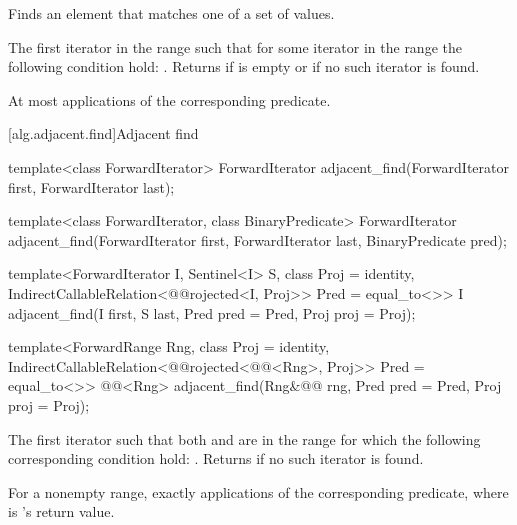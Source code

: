 \begin{itemdescr}
\pnum
\effects
Finds an element that matches one of a set of values.

\pnum
\returns
The first iterator
in the range 
such that for some
iterator
in the range 
the following condition hold:
.
Returns 
if  is empty or if
no such iterator is found.

\pnum
\complexity
At most
applications of the corresponding predicate.
\end{itemdescr}

[alg.adjacent.find]{Adjacent find}

%
\begin{removedblock}
\begin{itemdecl}
template<class ForwardIterator>
  ForwardIterator adjacent_find(ForwardIterator first, ForwardIterator last);

template<class ForwardIterator, class BinaryPredicate>
  ForwardIterator adjacent_find(ForwardIterator first, ForwardIterator last,
                              BinaryPredicate pred);
\end{itemdecl}
\end{removedblock}
\begin{addedblock}
\begin{itemdecl}
template<ForwardIterator I, Sentinel<I> S, class Proj = identity,
    IndirectCallableRelation<@@rojected<I, Proj>> Pred = equal_to<>>
  I
    adjacent_find(I first, S last, Pred pred = Pred{},
                  Proj proj = Proj{});

template<ForwardRange Rng, class Proj = identity,
    IndirectCallableRelation<@@rojected<@@<Rng>, Proj>> Pred = equal_to<>>
  @@<Rng>
    adjacent_find(Rng&@\newtxt{\&}@ rng, Pred pred = Pred{}, Proj proj = Proj{});
\end{itemdecl}
\end{addedblock}

\begin{itemdescr}
\pnum
\returns
The first iterator
such that both
and
are in
the range
for which
the following corresponding condition hold:
.
Returns 
if no such iterator is found.

\pnum
\complexity
For a nonempty range, exactly
applications of the corresponding predicate, where  is
's
return value.
\end{itemdescr}

